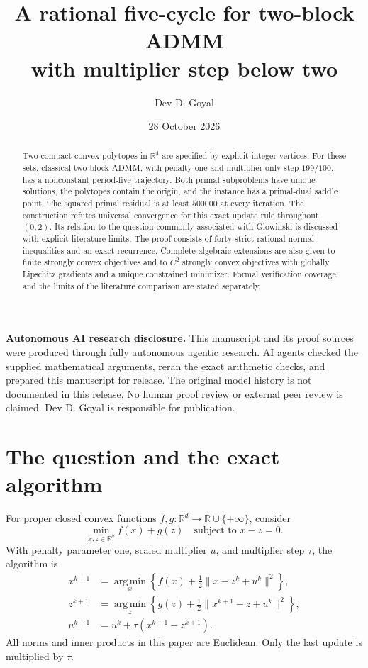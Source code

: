 \documentclass[11pt,a4paper]{article}
\title{\textbf{A rational five-cycle for two-block ADMM\\with multiplier step below two}}
\author{Dev D. Goyal}
\date{28 October 2026}
\theoremstyle{remark}
\newcommand{\R}{\mathbb R}
\newcommand{\norm}[1]{\lVert #1\rVert}
\newcommand{\argmin}{\operatorname*{arg\,min}}
\begin{document}
\maketitle
\noindent\textbf{Autonomous AI research disclosure.} This manuscript and its proof sources were produced through fully autonomous agentic research. AI agents checked the supplied mathematical arguments, reran the exact arithmetic checks, and prepared this manuscript for release. The original model history is not documented in this release. No human proof review or external peer review is claimed. Dev D. Goyal is responsible for publication.\par\medskip
\begin{abstract}
Two compact convex polytopes in $\R^4$ are specified by explicit integer vertices. For these sets, classical two-block ADMM, with penalty one and multiplier-only step $199/100$, has a nonconstant period-five trajectory. Both primal subproblems have unique solutions, the polytopes contain the origin, and the instance has a primal-dual saddle point. The squared primal residual is at least $500000$ at every iteration. The construction refutes universal convergence for this exact update rule throughout $(0,2)$. Its relation to the question commonly associated with Glowinski is discussed with explicit literature limits. The proof consists of forty strict rational normal inequalities and an exact recurrence. Complete algebraic extensions are also given to finite strongly convex objectives and to $C^2$ strongly convex objectives with globally Lipschitz gradients and a unique constrained minimizer. Formal verification coverage and the limits of the literature comparison are stated separately.
\end{abstract}


\section{The question and the exact algorithm}
For proper closed convex functions $f,g:\R^d\to\R\cup\{+\infty\}$, consider
\begin{equation}\label{eq:problem}
\min_{x,z\in\R^d} f(x)+g(z)\quad\text{subject to }x-z=0.
\end{equation}
With penalty parameter one, scaled multiplier $u$, and multiplier step $\tau$, the algorithm is
\begin{align}
x^{k+1}&=\argmin_x\left\{f(x)+\tfrac12\norm{x-z^k+u^k}^2\right\},\label{eq:admmx}\\
z^{k+1}&=\argmin_z\left\{g(z)+\tfrac12\norm{x^{k+1}-z+u^k}^2\right\},\label{eq:admmz}\\
u^{k+1}&=u^k+\tau(x^{k+1}-z^{k+1}).\label{eq:admmu}
\end{align}
All norms and inner products in this paper are Euclidean. Only the last update is multiplied by $\tau$.
\end{document}
